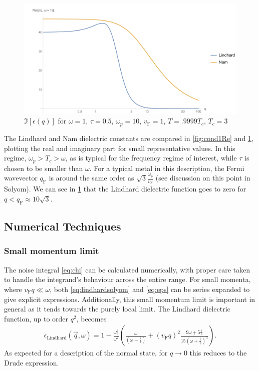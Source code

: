 \documentclass[%
 preprint,
 amsmath,amssymb,
 aps,
]{revtex4-2}
\newcommand{\vf}{v_{\mathrm{F}}}
\newcommand{\qf}{q_{\mathrm{F}}}
\begin{document}
\begin{figure}[htp]
	\centering
	\includegraphics[width=\linewidth]{Cond1Im}
	\caption{$\Im[\epsilon(q)]$ for $\omega = 1$, $\tau = 0.5$, $\omega_p = 10$, $\vf = 1$, $T = .9999 T_c$, $T_c = 3$} \label{fig:cond1Im}
\end{figure}

The Lindhard and Nam dielectric constants are compared in \cref{fig:cond1Re} and \cref{fig:cond1Im}, plotting the real and imaginary part for small representative values.
In this regime, $\omega_p > T_c > \omega$, as is typical for the frequency regime of interest, while $\tau$ is chosen to be smaller than $\omega$.
For a typical metal in this description, the Fermi wavevector $\qf$ is around the same order as $\sqrt{3}\frac{\omega_p}{\vf}$ (see discussion on this point in Solyom\cite{SolyomV3}).
We can see in \cref{fig:cond1Im} that the Lindhard dielectric function goes to zero for $q < \qf \approx 10 \sqrt{3}$.

\subsection{Numerical Techniques \label{subsec:technical}}

\subsubsection{Small momentum limit} \label{subsubsec:smallq}
The noise integral \eqref{eq:chi} can be calculated numerically, with proper care taken to handle the integrand's behaviour across the entire range.
For small momenta, where $\vf q \ll \omega$, both \eqref{eq:lindhardsolyom} and \eqref{eq:eps} can be series expanded to give explicit expressions.
Additionally, this small momentum limit is important in general as it tends towards the purely local limit.
The Lindhard dielectric function, up to order $q^2$, becomes
\begin{gather}
	\epsilon_{\mathrm{Lindhard}}(\vec{q}, \omega) = 1 - \frac{\omega_p^2}{\omega^2} \left(\frac{\omega}{(\omega + \frac{i}{\tau})} + (\vf q)^2  \frac{9 \omega + 5 \frac{i}{\tau}}{15 (\omega + \frac{i}{\tau})^3} \right). \label{eq:lindhardsmallkseries}
\end{gather}
As expected for a description of the normal state, for $q \rightarrow 0$ this reduces to the Drude expression.
\end{document}
